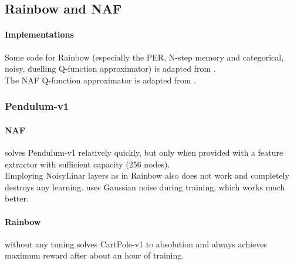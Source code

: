 \subsection{Rainbow and NAF}

\paragraph{Implementations}
Some code for Rainbow (especially the PER, N-step memory and categorical, noisy, duelling Q-function approximator) is adapted from \cite{rainbow_GitHub}.\\
The NAF Q-function approximator is adapted from \cite{NAF_GitHub}.

\subsubsection{Pendulum-v1}

\paragraph{NAF} solves Pendulum-v1 relatively quickly, but only when provided with a feature extractor with sufficient capacity (256 nodes).\\
Employing NoisyLinar layers as in Rainbow also does not work and completely destroys any learning. \cite{NAF} uses Gaussian noise during training, which works much better.

\paragraph{Rainbow} without any tuning solves CartPole-v1 to absolution and always achieves maximum reward after about an hour of training.

